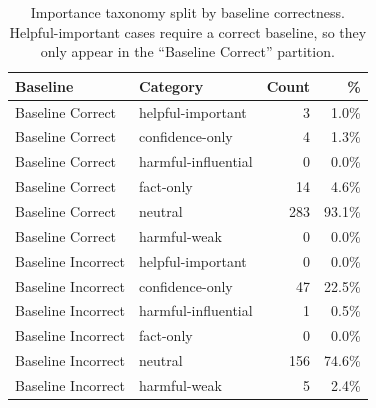 \begin{table}[h]
\centering\small
\begin{tabular}{llrr}
\toprule
Baseline & Category & Count & \% \\
\midrule
  Baseline Correct & helpful-important & 3 & 1.0\% \\
  Baseline Correct & confidence-only & 4 & 1.3\% \\
  Baseline Correct & harmful-influential & 0 & 0.0\% \\
  Baseline Correct & fact-only & 14 & 4.6\% \\
  Baseline Correct & neutral & 283 & 93.1\% \\
  Baseline Correct & harmful-weak & 0 & 0.0\% \\
  Baseline Incorrect & helpful-important & 0 & 0.0\% \\
  Baseline Incorrect & confidence-only & 47 & 22.5\% \\
  Baseline Incorrect & harmful-influential & 1 & 0.5\% \\
  Baseline Incorrect & fact-only & 0 & 0.0\% \\
  Baseline Incorrect & neutral & 156 & 74.6\% \\
  Baseline Incorrect & harmful-weak & 5 & 2.4\% \\
\bottomrule
\end{tabular}
\caption{Importance taxonomy split by baseline correctness. Helpful-important cases require a correct baseline, so they only appear in the ``Baseline Correct'' partition.}
\label{tab:e2_taxonomy_by_baseline}
\end{table}

